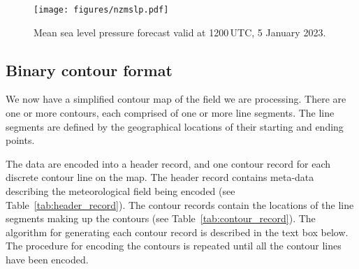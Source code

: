 \documentclass[12pt,a4paper]{article}
\begin{document}
\begin{figure}
\centering
\texttt{[image: figures/nzmslp.pdf]}
\caption{\label{fig:nzmslp}Mean sea level pressure forecast valid at
1200\,UTC, 5 January 2023.}
\end{figure}

\subsection*{Binary contour format}

We now have a simplified contour map of the field we are processing. There are
one or more contours, each comprised of one or more line segments. The line
segments are defined by the geographical locations of their starting and ending
points.

The data are encoded into a header record, and one contour record for each
discrete contour line on the map. The header record contains meta-data
describing the meteorological field being encoded (see
Table~\ref{tab:header_record}). The contour records contain the locations of
the line segments making up the contours (see Table~\ref{tab:contour_record}).
The algorithm for generating each contour record is described in the text box
below. The procedure for encoding the contours is repeated until all the
contour lines have been encoded.
\end{document}
